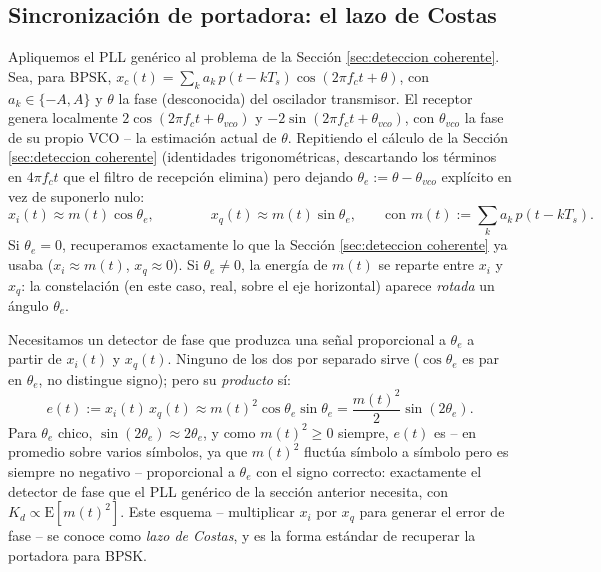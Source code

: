 \subsection*{Sincronización de portadora: el lazo de Costas}

Apliquemos el PLL genérico al problema de la Sección \ref{sec:deteccion coherente}. Sea, para BPSK, $x_c(t) = \sum_k a_k\, p(t-kT_s)\cos(2\pi f_c t+\theta)$, con $a_k\in\{-A,A\}$ y $\theta$ la fase (desconocida) del oscilador transmisor. El receptor genera localmente $2\cos(2\pi f_c t+\theta_{vco})$ y $-2\sin(2\pi f_c t+\theta_{vco})$, con $\theta_{vco}$ la fase de su propio VCO -- la estimación actual de $\theta$. Repitiendo el cálculo de la Sección \ref{sec:deteccion coherente} (identidades trigonométricas, descartando los términos en $4\pi f_c t$ que el filtro de recepción elimina) pero dejando $\theta_e:=\theta-\theta_{vco}$ explícito en vez de suponerlo nulo:
\begin{equation}\label{eq:xi xq con error de fase}
    x_i(t) \approx m(t)\cos\theta_e, \qquad\qquad x_q(t) \approx m(t)\sin\theta_e, \qquad\text{con } m(t):=\sum_k a_k\, p(t-kT_s).
\end{equation}
Si $\theta_e=0$, recuperamos exactamente lo que la Sección \ref{sec:deteccion coherente} ya usaba ($x_i\approx m(t)$, $x_q\approx 0$). Si $\theta_e\neq 0$, la energía de $m(t)$ se reparte entre $x_i$ y $x_q$: la constelación (en este caso, real, sobre el eje horizontal) aparece \emph{rotada} un ángulo $\theta_e$.

Necesitamos un detector de fase que produzca una señal proporcional a $\theta_e$ a partir de $x_i(t)$ y $x_q(t)$. Ninguno de los dos por separado sirve ($\cos\theta_e$ es par en $\theta_e$, no distingue signo); pero su \emph{producto} sí:
\begin{equation}\label{eq:error costas}
    e(t) := x_i(t)\,x_q(t) \approx m(t)^2\cos\theta_e\sin\theta_e = \frac{m(t)^2}{2}\sin(2\theta_e).
\end{equation}
Para $\theta_e$ chico, $\sin(2\theta_e)\approx 2\theta_e$, y como $m(t)^2\geqslant 0$ siempre, $e(t)$ es -- en promedio sobre varios símbolos, ya que $m(t)^2$ fluctúa símbolo a símbolo pero es siempre no negativo -- proporcional a $\theta_e$ con el signo correcto: exactamente el detector de fase que el PLL genérico de la sección anterior necesita, con $K_d\propto \mathrm E[m(t)^2]$. Este esquema -- multiplicar $x_i$ por $x_q$ para generar el error de fase -- se conoce como \emph{lazo de Costas}, y es la forma estándar de recuperar la portadora para BPSK.

